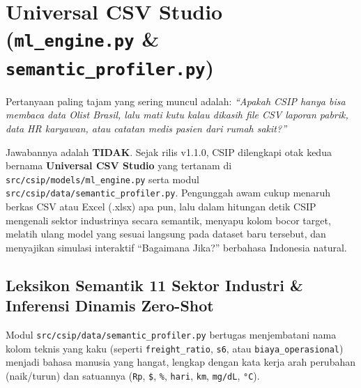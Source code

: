 \documentclass[11pt,a4paper,oneside]{book}
\newcommand{\code}[1]{{\small\nolinkurl{#1}}}
\begin{document}
\chapter{Universal CSV Studio (\texttt{ml\_engine.py} \& \texttt{semantic\_profiler.py})}

\begin{bisnisbox}
Pertanyaan paling tajam yang sering muncul adalah: \emph{``Apakah CSIP hanya bisa membaca data Olist Brasil, lalu mati kutu kalau dikasih file CSV laporan pabrik, data HR karyawan, atau catatan medis pasien dari rumah sakit?''}

Jawabannya adalah \textbf{TIDAK}. Sejak rilis v1.1.0, CSIP dilengkapi otak kedua bernama \textbf{Universal CSV Studio} yang tertanam di \code{src/csip/models/ml_engine.py} serta modul \code{src/csip/data/semantic_profiler.py}. Pengunggah awam cukup menaruh berkas CSV atau Excel (.xlsx) apa pun, lalu dalam hitungan detik CSIP mengenali sektor industrinya secara semantik, menyapu kolom bocor target, melatih ulang model yang sesuai langsung pada dataset baru tersebut, dan menyajikan simulasi interaktif ``Bagaimana Jika?'' berbahasa Indonesia natural.
\end{bisnisbox}

\section{Leksikon Semantik 11 Sektor Industri \& Inferensi Dinamis Zero-Shot}

Modul \code{src/csip/data/semantic_profiler.py} bertugas menjembatani nama kolom teknis yang kaku (seperti \code{freight_ratio}, \code{s6}, atau \code{biaya_operasional}) menjadi bahasa manusia yang hangat, lengkap dengan kata kerja arah perubahan (naik/turun) dan satuannya (\code{Rp}, \texttt{\$}, \texttt{\%}, \code{hari}, \code{km}, \code{mg/dL}, \code{°C}).
\end{document}

